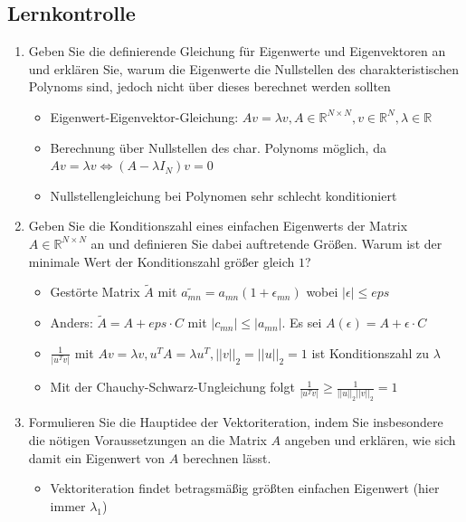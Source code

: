 \documentclass[]{article}
\newcommand*{\real}{\ensuremath{\mathbb{R}}}
\begin{document}
\subsection{Lernkontrolle}
	\begin{enumerate}
		\item Geben Sie die definierende Gleichung für Eigenwerte und Eigenvektoren an und erklären Sie, warum die Eigenwerte die Nullstellen des charakteristischen Polynoms sind, jedoch nicht über dieses berechnet werden sollten
			\begin{itemize}
				\item Eigenwert-Eigenvektor-Gleichung: $Av = \lambda v, A \in \real^{N \times N}, v \in \real^N, \lambda \in \real$
				\item Berechnung über Nullstellen des char. Polynoms möglich, da $Av = \lambda v  \Leftrightarrow (A- \lambda I_N)v = 0$
				\item Nullstellengleichung bei Polynomen sehr schlecht konditioniert
			\end{itemize}
		\item Geben Sie die Konditionszahl eines einfachen Eigenwerts der Matrix $A \in \real^{N \times N}$ an und definieren Sie dabei auftretende Größen. Warum ist der minimale Wert der Konditionszahl größer gleich $1$?
			\begin{itemize}
				\item Gestörte Matrix $\tilde{A}$ mit $\tilde{a_{mn}} = a_{mn}(1 + \epsilon_{mn})$ wobei $|\epsilon| \leq eps$
				\item Anders: $\tilde{A} = A + eps\cdot C$ mit $|c_{mn}| \leq |a_{mn}|$. Es sei $A(\epsilon) = A + \epsilon \cdot C$
				\item $\frac{1}{|u^Tv|}$ mit $Av = \lambda v, u^TA = \lambda u^T, ||v||_2 = ||u||_2 = 1$ ist Konditionszahl zu $\lambda$
                \item Mit der Chauchy-Schwarz-Ungleichung folgt $\frac{1}{|u^Tv|} \geq \frac{1}{||u||_2 ||v||_2} = 1$
			\end{itemize}
		\item Formulieren Sie die Hauptidee der Vektoriteration, indem Sie insbesondere die nötigen Voraussetzungen an die Matrix $A$ angeben und erklären, wie sich damit ein Eigenwert von $A$ berechnen lässt.
			\begin{itemize}
				\item Vektoriteration findet betragsmäßig größten einfachen Eigenwert (hier immer $\lambda_1$)

\end{itemize}
\end{enumerate}
\end{document}
